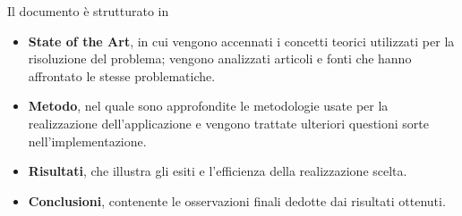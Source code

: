 Il documento è strutturato in 

\begin{itemize}
    \item \textbf{State of the Art}, in cui vengono accennati i concetti teorici utilizzati per la risoluzione 
        del problema; vengono analizzati articoli e fonti che hanno affrontato le stesse problematiche. 
    \item \textbf{Metodo}, nel quale sono approfondite le metodologie usate per la realizzazione 
        dell'applicazione e vengono trattate ulteriori questioni sorte nell'implementazione.
    \item \textbf{Risultati}, che illustra gli esiti e l'efficienza della realizzazione scelta.
    \item \textbf{Conclusioni}, contenente le osservazioni finali dedotte dai risultati ottenuti.
\end{itemize}